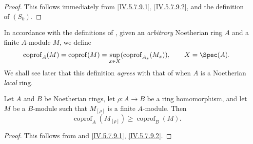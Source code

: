 
\begin{proof}
This follows immediately from \eqref{IV.5.7.9.1},
\eqref{IV.5.7.9.2}, and the definition of $(S_k)$.
\end{proof}

\begin{env}[5.7.12]
\label{IV.5.7.12}
In accordance with the definitions of , given an
\emph{arbitrary} Noetherian ring $A$ and a finite $A$-module $M$, we define
\[
\operatorname{coprof}_A(M)
 =\operatorname{coprof}(M)
 =\sup_{x\in X}(\operatorname{coprof}_{A_x}(M_x)),
\qquad X=\Spec(A).
\]
We shall see later  that this definition \emph{agrees} with
that of  when $A$ is a Noetherian \emph{local} ring.
\end{env}

\begin{corollary}[5.7.13]
\label{IV.5.7.13}
Let $A$ and $B$ be Noetherian rings, let $\rho:A\to B$ be a ring
homomorphism, and let $M$ be a $B$-module such that $M_{[\rho]}$ is
a finite $A$-module.  Then
\begin{equation}
\operatorname{coprof}_A(M_{[\rho]})
 \geq \operatorname{coprof}_B(M).
\tag{5.7.13.1}\label{IV.5.7.13.1}
\end{equation}
\end{corollary}

\begin{proof}
This follows from  and
\eqref{IV.5.7.9.1}, \eqref{IV.5.7.9.2}.
\end{proof}
